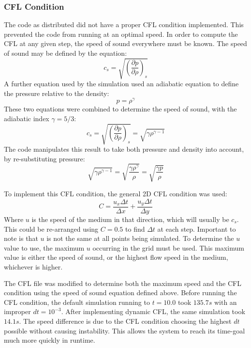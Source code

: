 \documentclass[twocolumn]{article}
\begin{document}
\subsubsection{CFL Condition}
The code as distributed did not have a proper CFL condition implemented. This prevented the code from running at an optimal speed. In order to compute the CFL at any given step, the speed of sound everywhere must be known. The speed of sound may be defined by the equation:
\begin{equation}
c_s = \sqrt{(\frac{\partial p}{\partial \rho})_s}
\end{equation}
A further equation used by the simulation used an adiabatic equation to define the pressure relative to the density:
\begin{equation}
p = \rho^\gamma
\end{equation}
These two equations were combined to determine the speed of sound, with the adiabatic index $\gamma = 5/3$:
\begin{equation}
c_s = \sqrt{(\frac{\partial p}{\partial \rho})_s} = \sqrt{\gamma \rho^{\gamma-1}}
\end{equation}
The code manipulates this result to take both pressure and density into account, by re-substituting pressure:
\begin{equation}
\sqrt{\gamma \rho^{\gamma-1}} = \sqrt{\frac{\gamma \rho^\gamma}{\rho}} = \sqrt{\frac{\gamma p}{\rho}}
\end{equation}

To implement this CFL condition, the general 2D CFL condition was used:
\begin{equation}
C = \frac{u_x \Delta t}{\Delta x} + \frac{u_y \Delta t}{\Delta y}
\end{equation}
Where $u$ is the speed of the medium in that direction, which will usually be $c_s$. This could be re-arranged using $C=0.5$ to find $\Delta t$ at each step. Important to note is that $u$ is not the same at all points being simulated. To determine the $u$ value to use, the maximum $u$ occurring in the grid must be used. This maximum value is either the speed of sound, or the highest flow speed in the medium, whichever is higher. 

The CFL file was modified to determine both the maximum speed and the CFL condition using the speed of sound equation defined above. Before running the CFL condition, the default simulation running to $t=10.0$ took $135.7s$ with an improper $dt=10^{-3}$. After implementing dynamic CFL, the same simulation took $14.1s$. The speed difference is due to the CFL condition choosing the highest $dt$ possible without causing instability. This allows the system to reach its time-goal much more quickly in runtime. 
\end{document}

